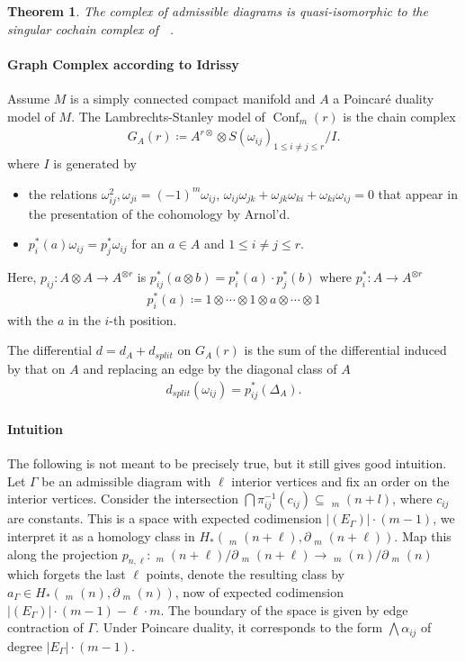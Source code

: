 \documentclass{scrartcl}
\theoremstyle{plain}
\newtheorem{theorem}{Theorem}[section]
\theoremstyle{definition}
\newcommand{\abs}[1]{\left\lvert#1\right\rvert}
\renewcommand{\subset}{\subseteq}
\newcommand{\defeq}{\coloneqq}
\DeclareMathOperator{\Conf}{Conf}
\DeclareMathOperator{\cConf}{\overline{Conf}}
\begin{document}
\begin{theorem}
    The complex of admissible diagrams is quasi-isomorphic to the singular cochain complex of $\cConf$.
\end{theorem}

\paragraph{Graph Complex according to Idrissy \cite{idrissi2021real}} Assume $M$ is a simply connected compact manifold and $A$ a Poincaré duality model of $M$. The Lambrechts-Stanley model of $\Conf_m(r)$ is the chain complex 
\begin{align*}
    G_A(r) \defeq A^{r\otimes} \otimes S(\omega_{ij})_{1 \leq i\neq j\leq r} / I.
\end{align*}
where $I$ is generated by 
\begin{itemize}
    \item the relations $\omega_{ij}^2, \omega_{ji} = (-1)^m \omega_{ij}$, $\omega_{ij}\omega_{jk} + \omega_{jk}\omega_{ki} + \omega_{ki}\omega_{ij} = 0$ that appear in the presentation of the cohomology by Arnol'd.
    \item $p_i^*(a)\omega_{ij} = p_j^*\omega_{ij}$ for an $a\in A$ and $1\leq i\neq j \leq r$. 
\end{itemize}

Here, $p_{ij} \colon A\otimes A \to A^{\otimes r}$ is $p_{ij}^*(a\otimes b) = p_i^*(a)\cdot p_j^*(b)$ where $p_i^*\colon A\to A^{\otimes r}$
\begin{align*}
    p_i^*(a) \defeq 1\otimes \cdots \otimes 1\otimes a\otimes\cdots\otimes 1
\end{align*}
with the $a$ in the $i$-th position. 

The differential $d = d_A + d_{split}$ on $G_A(r)$ is the sum of the differential induced by that on $A$ and replacing an edge by the diagonal class of $A$
\begin{align*}
    d_{split}(\omega_{ij}) = p_{ij}^*(\Delta_A).
\end{align*}



\paragraph{Intuition} The following is not meant to be precisely true, but it still gives good intuition. Let $\Gamma$ be an admissible diagram with $\ell$ interior vertices and fix an order on the interior vertices. Consider the intersection $\bigcap \pi_{ij}^{-1}(c_{ij})\subset \cConf_m(n+l)$, where $c_{ij}$ are constants. This is a space with expected codimension $\abs{(E_\Gamma)}\cdot (m-1)$, we interpret it as a homology class in $H_*(\cConf_m(n+\ell), \partial\cConf_m(n+\ell))$. Map this along the projection $p_{n,\ell}\colon \cConf_m(n+\ell)/\partial\cConf_m(n+\ell) \to \cConf_m(n)/\partial\cConf_m(n)$ which forgets the last $\ell$ points, denote the resulting class by $a_\Gamma\in H_*(\cConf_m(n), \partial\cConf_m(n))$, now of expected codimension $\abs{(E_\Gamma)}\cdot (m-1) - \ell\cdot m$. The boundary of the space is given by edge contraction of $\Gamma$. Under Poincare duality, it corresponds to the form $\bigwedge \alpha_{ij}$ of degree $\abs{E_\Gamma}\cdot (m-1)$. 
\end{document}
